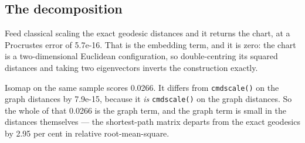 \documentclass[
  british,
  a4paper,
]{book}
\newenvironment{Shaded}{\begin{snugshade}}{\end{snugshade}}
\newcommand{\AttributeTok}[1]{\textcolor[rgb]{0.13,0.29,0.53}{#1}}
\newcommand{\CommentTok}[1]{\textcolor[rgb]{0.56,0.35,0.01}{\textit{#1}}}
\newcommand{\DecValTok}[1]{\textcolor[rgb]{0.00,0.00,0.81}{#1}}
\newcommand{\FunctionTok}[1]{\textcolor[rgb]{0.13,0.29,0.53}{\textbf{#1}}}
\newcommand{\NormalTok}[1]{#1}
\newcommand{\OtherTok}[1]{\textcolor[rgb]{0.56,0.35,0.01}{#1}}
\newcommand{\SpecialCharTok}[1]{\textcolor[rgb]{0.81,0.36,0.00}{\textbf{#1}}}
\newcommand{\StringTok}[1]{\textcolor[rgb]{0.31,0.60,0.02}{#1}}
\begin{document}
\subsection{The decomposition}\label{the-decomposition}

\begin{Shaded}
\end{Shaded}

Feed classical scaling the exact geodesic distances and it returns the chart, at
a Procrustes error of 5.7e-16. That
is the embedding term, and it is zero: the chart is a two-dimensional Euclidean
configuration, so double-centring its squared distances and taking two
eigenvectors inverts the construction exactly.

Isomap on the same sample scores 0.0266. It differs from
\texttt{cmdscale()} on the graph distances by 7.9e-15,
because it \emph{is} \texttt{cmdscale()} on the graph distances. So the whole of that
0.0266 is the graph term, and the graph term is small in the
distances themselves --- the shortest-path matrix departs from the exact geodesics
by 2.95 per cent in relative root-mean-square.
\end{document}
